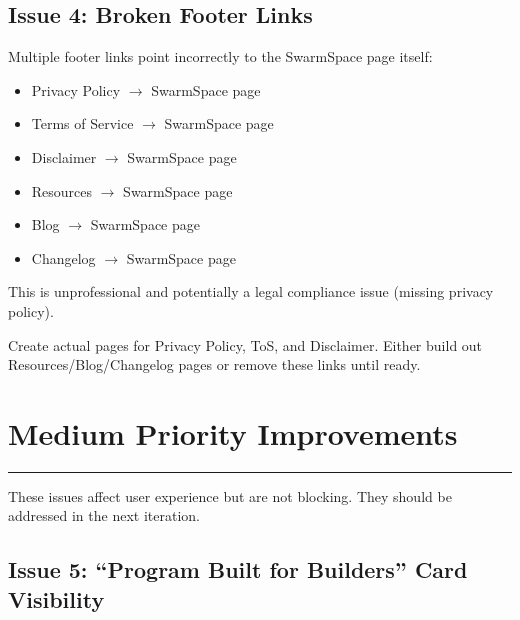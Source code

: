 \documentclass[12pt,a4paper]{article}
\begin{document}
\subsection{Issue 4: Broken Footer Links}

\begin{description}[leftmargin=!,labelwidth=\widthof{\bfseries Problem:}]
    \item[Problem:] Multiple footer links point incorrectly to the SwarmSpace page itself:
    \begin{itemize}
        \item Privacy Policy $\rightarrow$ SwarmSpace page
        \item Terms of Service $\rightarrow$ SwarmSpace page
        \item Disclaimer $\rightarrow$ SwarmSpace page
        \item Resources $\rightarrow$ SwarmSpace page
        \item Blog $\rightarrow$ SwarmSpace page
        \item Changelog $\rightarrow$ SwarmSpace page
    \end{itemize}
    
    \item[Impact:] This is unprofessional and potentially a legal compliance issue (missing privacy policy).
    
    \item[Recommendation:] Create actual pages for Privacy Policy, ToS, and Disclaimer. Either build out Resources/Blog/Changelog pages or remove these links until ready.
\end{description}

\newpage

\section{Medium Priority Improvements}
\textcolor{warningorange}{\rule{\linewidth}{2pt}}

These issues affect user experience but are not blocking. They should be addressed in the next iteration.

\subsection{Issue 5: ``Program Built for Builders'' Card Visibility}
\end{document}
